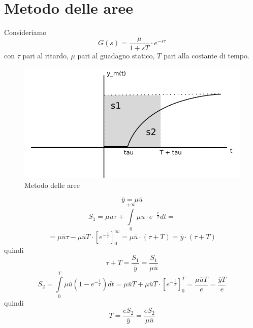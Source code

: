 \documentclass[a4paper]{report}
\begin{document}
\section{Metodo delle aree}
Consideriamo
\[
G(s) = \dfrac{\mu}{1 + sT}\cdot e^{-s \tau}
\]
con $\tau$ pari al ritardo, $\mu$ pari al guadagno statico, $T$ pari
alla costante di tempo.
\begin{figure}[!h]
  \begin{center}
    \includegraphics[scale=0.4]{./images/metodoDelleAree}
    \caption{Metodo delle aree}
    \label{fig:metodoDelleAree}
  \end{center}
\end{figure}
\[
\overline{y} = \mu \overline{u}
\]
\[
S_1 = \mu \overline{u} \tau + \int\limits_{0}^{+ \infty} \mu
\overline{u}\cdot e^{-\frac{t}{T}} dt =
\]
\[
= \mu\overline{u}\tau - \mu
\overline{u} T \cdot \left[e^{-\frac{t}{T}}\right]^{\infty}_0 =  \mu
\overline{u}\cdot(\tau + T) = \overline{y}\cdot(\tau + T)
\]
quindi
\[
\tau + T = \dfrac{S_1}{\overline{y}} = \dfrac{S_1}{\mu \overline{u}}
\]
\[
S_2 = \int\limits_{0}^{T} \mu \overline{u} (1 - e^{- \frac{t}{T}}) dt
= \mu \overline{u} T + \mu \overline{u} T \cdot
\left[e^{-\frac{t}{T}}\right]^{T}_0 = \dfrac{\mu \overline{u} T}{e} =
\dfrac{\overline{y} T}{e} 
\]
quindi
\[
T = \dfrac{e S_2}{\overline{y}} = \dfrac{e S_2}{\mu \overline{u}}
\]
\end{document}
